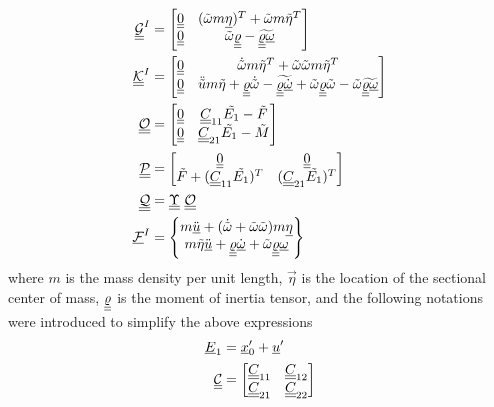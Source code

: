 \begin{align}
        \label{mathcalG}
        \underline{\underline{\mathcal{G}}}^I &= \begin{bmatrix}
        \underline{\underline{0}} & (\tilde{\omega} m \underline{\eta})^T+\tilde{\omega} m \tilde{\eta}^T  \\
        \underline{\underline{0}} & \tilde{\omega} \underline{\underline{\varrho}}-\widetilde{\underline{\underline{\varrho}} \underline{\omega}}
        \end{bmatrix} \\
        \label{mathcalK}
        \underline{\underline{\mathcal{K}}}^I &= \begin{bmatrix}
        \underline{\underline{0}} & \dot{\tilde{\omega}}m\tilde{\eta}^T + \tilde{\omega} \tilde{\omega}m\tilde{\eta}^T  \\
        \underline{\underline{0}} & \ddot{\tilde{u}}m\tilde{\eta} + \underline{\underline{\varrho}} \dot{\tilde{\omega}}-\widetilde{\underline{\underline{\varrho}} \underline{\dot{\omega}}}+\tilde{\omega} \underline{\underline{\varrho}} \tilde{\omega} - \tilde{\omega}  \widetilde{\underline{\underline{\varrho}} \underline{\omega}}
        \end{bmatrix}\\
	\label{mathcalO}
	\mathcal{\underline{\underline{O}}} &= \begin{bmatrix}
	\underline{\underline{0}} & \underline{\underline{C}}_{11} \tilde{E_1} - \tilde{F} \\
	\underline{\underline{0}}& \underline{\underline{C}}_{21} \tilde{E_1} - \tilde{M}
	\end{bmatrix} \\
	\label{mathcalP}
	\mathcal{\underline{\underline{P}}} &= \begin{bmatrix}
	\underline{\underline{0}} & \underline{\underline{0}} \\
	\tilde{F} +  (\underline{\underline{C}}_{11} \tilde{E_1})^T & (\underline{\underline{C}}_{21} \tilde{E_1})^T
	\end{bmatrix}  \\
	\label{mathcalQ}
	\mathcal{\underline{\underline{Q}}} &= \underline{\underline{\Upsilon}}~ \mathcal{\underline{\underline{O}}} \\
	\label{mathcalF}
	\underline{\mathcal{F}}^I &= \begin{Bmatrix}
	m \ddot{\underline{u}} + (\dot{\tilde{\omega}} + \tilde{\omega} \tilde{\omega})m \underline{\eta} \\
	m \tilde{\eta} \ddot{\underline{u}} +\underline{\underline{\varrho}}\dot{\underline{\omega}}+\tilde{\omega}\underline{\underline{\varrho}}\underline{\omega}
	\end{Bmatrix}
\end{align}
where $m$ is the mass density per unit length, $\vec{\eta}$ is the location of the sectional center of mass, $\underline{\underline{\varrho}}$ is the moment of inertia tensor, and the following notations were introduced to simplify the above expressions
\begin{align}
    \label{E1}
    \underline{E}_1 &= \underline{x}_0^\prime + \underline{u}^\prime \\
    \label{PartC}
    \underline{\underline{\mathcal{C}}} &= \begin{bmatrix}
    \underline{\underline{C}}_{11} & \underline{\underline{C}}_{12} \\
    \underline{\underline{C}}_{21} & \underline{\underline{C}}_{22}
    \end{bmatrix}
\end{align} 

